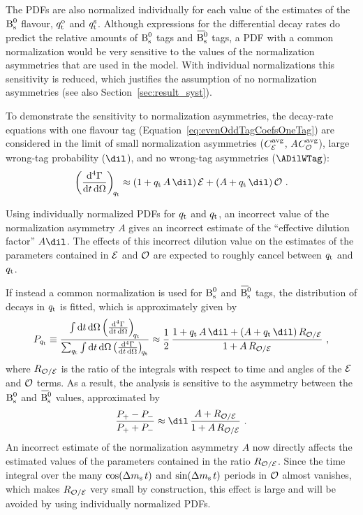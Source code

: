 The PDFs are also normalized individually for each value of the estimates of the $\text{B}_\text{s}^\text{0}$ flavour, ${q_\mathrm{t}^\text{o}}$ and ${q_\mathrm{t}^\text{s}}$. Although expressions
for the differential decay rates do predict the relative amounts of $\text{B}_\text{s}^\text{0}$ tags and $\Bsbar$ tags, a PDF with a common normalization would
be very sensitive to the values of the normalization asymmetries that are used in the model. With individual normalizations this
sensitivity is reduced, which justifies the assumption of no normalization asymmetries (see also Section~\ref{sec:result_syst}).

To demonstrate the sensitivity to normalization asymmetries, the decay-rate equations with one flavour tag
(Equation~\ref{eq:evenOddTagCoefsOneTag}) are considered in the limit of small normalization asymmetries (${C_{\mathcal{E}_{}}^{\text{avg}}}$,
$A$\textequiv${C_{\mathcal{O}_{}}^{\text{avg}}}$), large wrong-tag probability ($\dil$), and no wrong-tag asymmetries
($\ADilWTag$):
\begin{equation}
  \left(\frac{\ud^4\Gamma}{\ud t\, \ud\Omega}\right)_{\!\qt}
      \approx (1 + \qt\,A\,\dil)\,\even + (A + \qt\,\dil)\,\odd \ .
\end{equation}

Using individually normalized PDFs for $q_\mathrm{t}$\texteq{} and $q_\mathrm{t}$\texteq{}, an incorrect value of the normalization asymmetry $A$
gives an incorrect estimate of the ``effective dilution factor'' $A$\textpm$\dil$. The effects of this incorrect dilution value on the
estimates of the parameters contained in $\mathcal{E}$ and $\mathcal{O}$ are expected to roughly cancel between $q_\mathrm{t}$\texteq{} and $q_\mathrm{t}$\texteq{}.

If instead a common normalization is used for $\text{B}_\text{s}^\text{0}$ and $\Bsbar$ tags, the distribution of decays in $q_\mathrm{t}$ is fitted, which is
approximately given by
\begin{equation}
  P_{\qt}
    \equiv \frac{\int\ud t\, \ud\Omega\left(\frac{\ud^4\Gamma}{\ud t\, \ud\Omega}\right)_{\!\qt}}
                {\sum_{\qt}\int\ud t\, \ud\Omega\left(\frac{\ud^4\Gamma}{\ud t\, \ud\Omega}\right)_{\!\qt}}
    \approx \frac{1}{2}\, \frac{1 + \qt\,A\,\dil + (A + \qt\,\dil)\,R_{\odd/\even}}{1 + A\,R_{\odd/\even}}\ ,
\end{equation}
where $R_{\mathcal{O}/\mathcal{E}}$ is the ratio of the integrals with respect to time and angles of the $\mathcal{E}$ and $\mathcal{O}$ terms. As a result, the
analysis is sensitive to the asymmetry between the $\text{B}_\text{s}^\text{0}$ and $\Bsbar$ values, approximated by
\begin{equation}
  \frac{P_+ - P_-}{P_+ + P_-} \approx \dil\, \frac{A + R_{\odd/\even}}{1 + A\,R_{\odd/\even}}\ .
\end{equation}
An incorrect estimate of the normalization asymmetry $A$ now directly affects the estimated values of the parameters contained in the ratio
$R_{\mathcal{O}/\mathcal{E}}$. Since the time integral over the many $\cos\!\left(\Delta m_\text{s}\, t\right)$ and $\sin\!\left(\Delta m_\text{s}\, t\right)$ periods in $\mathcal{O}$ almost vanishes, which makes $R_{\mathcal{O}/\mathcal{E}}$
very small by construction, this effect is large and will be avoided by using individually normalized PDFs.
